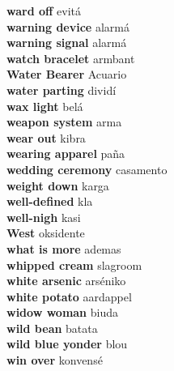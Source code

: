 \textbf{ ward off  } evitá \\
\textbf{ warning device  } alarmá \\
\textbf{ warning signal  } alarmá \\
\textbf{ watch bracelet  } armbant \\
\textbf{ Water Bearer  } Acuario \\
\textbf{ water parting  } dividí \\
\textbf{ wax light  } belá \\
\textbf{ weapon system  } arma \\
\textbf{ wear out  } kibra \\
\textbf{ wearing apparel  } paña \\
\textbf{ wedding ceremony  } casamento \\
\textbf{ weight down  } karga \\
\textbf{ well-defined  } kla \\
\textbf{ well-nigh  } kasi \\
\textbf{ West  } oksidente \\
\textbf{ what is more  } ademas \\
\textbf{ whipped cream  } slagroom \\
\textbf{ white arsenic  } arséniko \\
\textbf{ white potato  } aardappel \\
\textbf{ widow woman  } biuda \\
\textbf{ wild bean  } batata \\
\textbf{ wild blue yonder  } blou \\
\textbf{ win over  } konvensé \\
